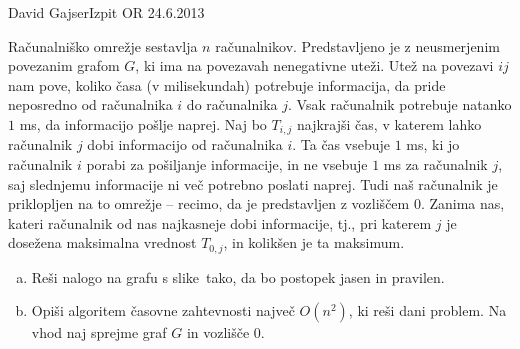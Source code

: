 \begin{naloga}{David Gajser}{Izpit OR 24.6.2013}
\begin{vprasanje}
Računalniško omrežje sestavlja $n$ računalnikov.
Predstavljeno je z neusmerjenim povezanim grafom $G$,
ki ima na povezavah nenegativne uteži.
Utež na povezavi $ij$ nam pove,
koliko časa (v milisekundah) potrebuje informacija,
da pride neposredno od računalnika $i$ do računalnika $j$.
Vsak računalnik potrebuje natanko $1$ ms, da informacijo pošlje naprej.
Naj bo $T_{i,j}$ najkrajši čas,
v katerem lahko računalnik $j$ dobi informacijo od računalnika $i$.
Ta čas vsebuje $1$ ms, ki jo računalnik $i$ porabi za pošiljanje informacije,
in ne vsebuje $1$ ms za računalnik $j$,
saj slednjemu informacije ni več potrebno poslati naprej.
Tudi naš računalnik je priklopljen na to omrežje
-- recimo, da je predstavljen z vozliščem 0.
Zanima nas, kateri računalnik od nas najkasneje dobi informacije,
tj., pri katerem $j$ je dosežena maksimalna vrednost $T_{0,j}$,
in kolikšen je ta maksimum.

\begin{enumerate}[(a)]
\item Reši nalogo na grafu s slike~\fig tako,
da bo postopek jasen in pravilen.

\item Opiši algoritem časovne zahtevnosti največ $O(n^2)$,
ki reši dani problem.
Na vhod naj sprejme graf $G$ in vozlišče $0$.
\end{enumerate}

\begin{slika}
\pgfslika
{}
\end{slika}
\end{vprasanje}
\begin{odgovor}
\end{odgovor}
\end{naloga}
